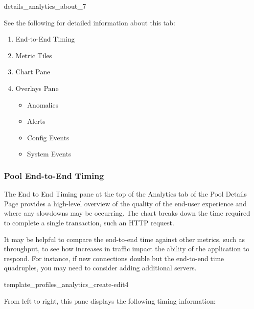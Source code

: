 \documentclass[letterpaper,10pt,english]{sphinxmanual}
\begin{document}
details\_analytics\_about\_7

See the following for detailed information about this tab:
\begin{enumerate}
\item {} 
End-to-End Timing

\item {} 
Metric Tiles

\item {} 
Chart Pane

\item {} 
Overlays Pane
\begin{itemize}
\item {} 
Anomalies

\item {} 
Alerts

\item {} 
Config Events

\item {} 
System Events

\end{itemize}

\end{enumerate}


\subsubsection{Pool End-to-End Timing}
\label{\detokenize{getting_started/pool:pool-end-to-end-timing}}
The End to End Timing pane at the top of the Analytics tab of the Pool Details Page provides a high-level overview of the quality of the end-user experience and where any slowdowns may be occurring. The chart breaks down the time required to complete a single transaction, such an HTTP request.

It may be helpful to compare the end-to-end time against other metrics, such as throughput, to see how increases in traffic impact the ability of the application to respond. For instance, if new connections double but the end-to-end time quadruples, you may need to consider adding additional servers.

template\_profiles\_analytics\_create-edit4

From left to right, this pane displays the following timing information:
\end{document}
